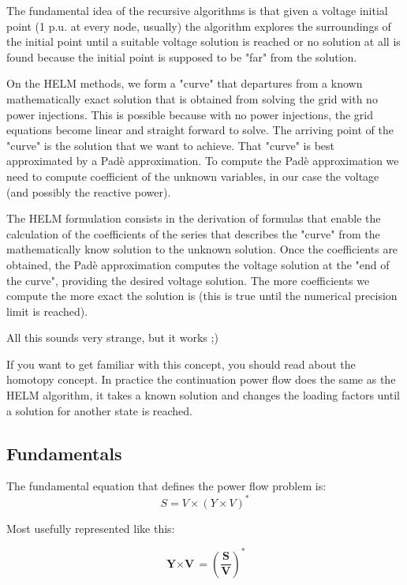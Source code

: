 \documentclass[11pt,fleqn]{book} %
\begin{document}
The fundamental idea of the recursive algorithms is that given a voltage initial point (1 p.u. at every node, usually) the algorithm explores the surroundings of the initial point until a suitable voltage solution is reached or no solution at all is found because the initial point is supposed to be "far" from the solution.

On the HELM methods, we form a "curve" that departures from a known mathematically exact solution that is obtained from solving the grid with no power injections. This is possible because with no power injections, the grid equations become linear and straight forward to solve. The arriving point of the "curve" is the solution that we want to achieve. That "curve" is best approximated by a Padè approximation. To compute the Padè approximation we need to compute coefficient of the unknown variables, in our case the voltage (and possibly the reactive power).

The HELM formulation consists in the derivation of formulas that enable the calculation of the coefficients of the series that describes the "curve" from the mathematically know solution to the unknown solution. Once the coefficients are obtained, the Padè approximation computes the voltage solution at the "end of the curve", providing the desired voltage solution. The more coefficients we compute the more exact the solution is (this is true until the numerical precision limit is reached).\newline 


All this sounds very strange, but it works ;)\newline 


If you want to get familiar with this concept, you should read about the homotopy concept. In practice the continuation power flow does the same as the HELM algorithm, it takes a known solution and changes the loading factors until a solution for another state is reached.

\subsection{Fundamentals}

The fundamental equation that defines the power flow problem is:
\begin{equation}
S = V \times (Y \times V)^*
\end{equation}

Most usefully represented like this:


\begin{equation}
{\textbf{Y} \times \textbf{V}} = \left(\frac{\textbf{S}}{\textbf{V}}\right)^* 
\label{base_eq}
\end{equation}
\end{document}
